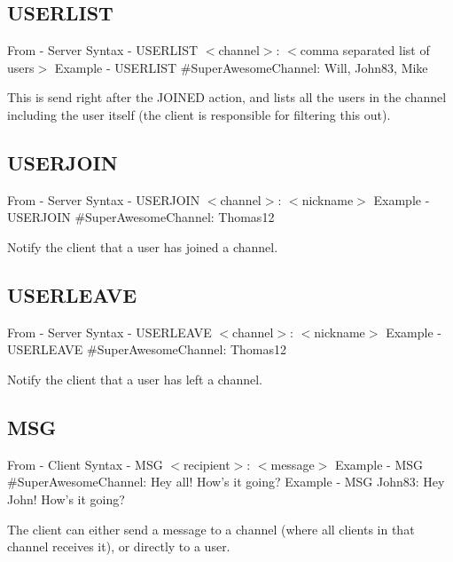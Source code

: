 \documentclass[12pt]{rapport}
\begin{document}
\subsection*{USERLIST}
From    - Server\newline
Syntax  - USERLIST $<$channel$>$: $<$comma separated list of users$>$\newline
Example - USERLIST \#SuperAwesomeChannel: Will, John83, Mike\newline

\noindent This is send right after the JOINED action, and lists all the users in the channel including the user itself (the client is responsible for filtering this out).

\subsection*{USERJOIN}
From    - Server\newline
Syntax  - USERJOIN $<$channel$>$: $<$nickname$>$\newline
Example - USERJOIN \#SuperAwesomeChannel: Thomas12\newline

\noindent Notify the client that a user has joined a channel.

\subsection*{USERLEAVE}
From    - Server\newline
Syntax  - USERLEAVE $<$channel$>$: $<$nickname$>$\newline
Example - USERLEAVE \#SuperAwesomeChannel: Thomas12\newline

\noindent Notify the client that a user has left a channel.

\subsection*{MSG}
From    - Client\newline
Syntax  - MSG $<$recipient$>$: $<$message$>$\newline
Example - MSG \#SuperAwesomeChannel: Hey all! How's it going?\newline
Example - MSG John83: Hey John! How's it going?\newline

\noindent The client can either send a message to a channel (where all clients in that channel receives it), or directly to a user.
\end{document}
